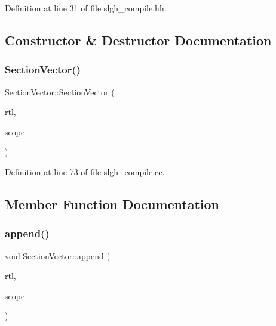 Definition at line 31 of file slgh\+\_\+compile.\+hh.



\subsection{Constructor \& Destructor Documentation}
\mbox{\label{class_section_vector_aeaabad6fe82b91f5d229affae85e60da}} 
\subsubsection{\texorpdfstring{SectionVector()}{SectionVector()}}
{\footnotesize\ttfamily Section\+Vector\+::\+Section\+Vector (\begin{DoxyParamCaption}\item[{\mbox{\hyperlink{class_construct_tpl}{Construct\+Tpl}} $\ast$}]{rtl,  }\item[{\mbox{\hyperlink{class_symbol_scope}{Symbol\+Scope}} $\ast$}]{scope }\end{DoxyParamCaption})}



Definition at line 73 of file slgh\+\_\+compile.\+cc.



\subsection{Member Function Documentation}
\mbox{\label{class_section_vector_a76c623f1984fcb88dc141d85066a97c6}} 
\subsubsection{\texorpdfstring{append()}{append()}}
{\footnotesize\ttfamily void Section\+Vector\+::append (\begin{DoxyParamCaption}\item[{\mbox{\hyperlink{class_construct_tpl}{Construct\+Tpl}} $\ast$}]{rtl,  }\item[{\mbox{\hyperlink{class_symbol_scope}{Symbol\+Scope}} $\ast$}]{scope }\end{DoxyParamCaption})}



